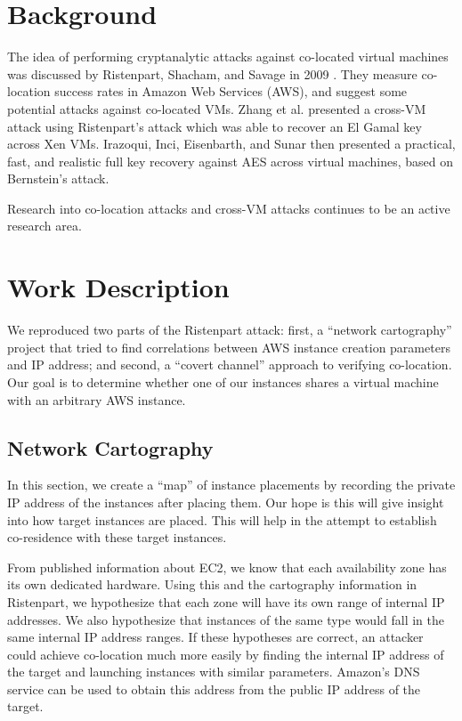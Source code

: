 \documentclass[conference]{IEEEtran}
\begin{document}
\section{Background}\label{sec:background}
The idea of performing cryptanalytic attacks against co-located virtual machines was discussed by Ristenpart, Shacham,
  and Savage in 2009 \cite{ristenpart2009cloud}.
They measure co-location success rates in Amazon Web Services (AWS), and suggest some potential attacks against
  co-located VMs.
Zhang \cite{zhang2014cross} et al. presented a cross-VM attack using Ristenpart's attack which was able to recover an El Gamal key across
Xen VMs.
Irazoqui, Inci, Eisenbarth, and Sunar \cite{irazoqui2014wait} then presented a practical, fast, and realistic full key
  recovery against AES across virtual machines, based on Bernstein's \cite{bernstein2005cache} attack.

Research into co-location attacks and cross-VM attacks continues to be an active research area.

\section{Work Description}
We reproduced two parts of the Ristenpart attack: first, a ``network cartography'' project that tried to find
  correlations between AWS instance creation parameters and IP address; and second, a ``covert channel'' approach to
  verifying co-location.
Our goal is to determine whether one of our instances shares a virtual machine with an arbitrary AWS instance.

\subsection{Network Cartography}
In this section, we create a “map” of instance placements by recording the private IP address of the instances after placing them.
Our hope is this will give insight into how target instances are placed.
This will help in the attempt to establish co-residence with these target instances.

From published information about EC2, we know that each availability zone has its own dedicated hardware. 
Using this and the cartography information in Ristenpart, we hypothesize that each zone will have its own 
range of internal IP addresses. 
We also hypothesize that instances of the same type would fall in the same internal IP address ranges. 
If these hypotheses are correct, an attacker could achieve co-location much more easily by finding the internal 
IP address of the target and launching instances with similar parameters. 
Amazon’s DNS service can be used to obtain this address from the public IP address of the target.
\end{document}

